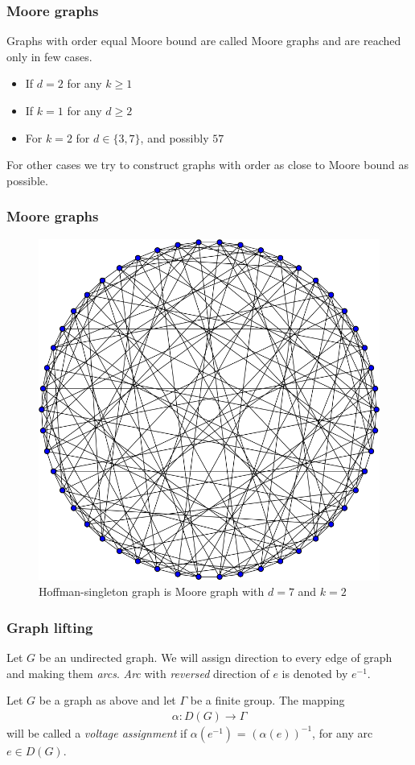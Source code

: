 \documentclass{beamer}
\begin{document}
\begin{frame}
	\frametitle{Moore graphs}
	Graphs with order equal Moore bound are called Moore graphs and are reached only in few cases.	
	\begin{itemize}
		\item If $d = 2$ for any $k \geq 1$
		\item If $k = 1$ for any $d \geq 2$
		\item For $k = 2$ for $d \in \{3, 7 \}$, and possibly $57$
	\end{itemize}
	For other cases we try to construct graphs with order as close to Moore bound as possible.
\end{frame}
\begin{frame}
	\frametitle{Moore graphs}
	\begin{figure}[!ht]
 		\centering
 		\includegraphics[scale=0.25]{Hoffman-Singleton_graph.png}
		\caption{Hoffman-singleton graph is Moore graph with $d=7$ and $k=2$ }
	\end{figure}
\end{frame}
\begin{frame}
	\frametitle{Graph lifting}
	Let $G$ be an undirected graph. We will assign direction to every edge of graph and making them {\em arcs}. {\em Arc} with {\em reversed} direction of $e$ is denoted by $e^{-1}$. 
	\begin{definition}
		Let $G$ be a graph as above and let $\Gamma$ be a finite group. The mapping
		\begin{align*}
			\alpha: D(G) \rightarrow \Gamma
		\end{align*}
		will be called a {\em voltage assignment} if $\alpha(e^{-1})$ = $(\alpha(e))^{-1}$, for any arc $e \in D(G)$.
	\end{definition}
\end{frame}
\end{document}
